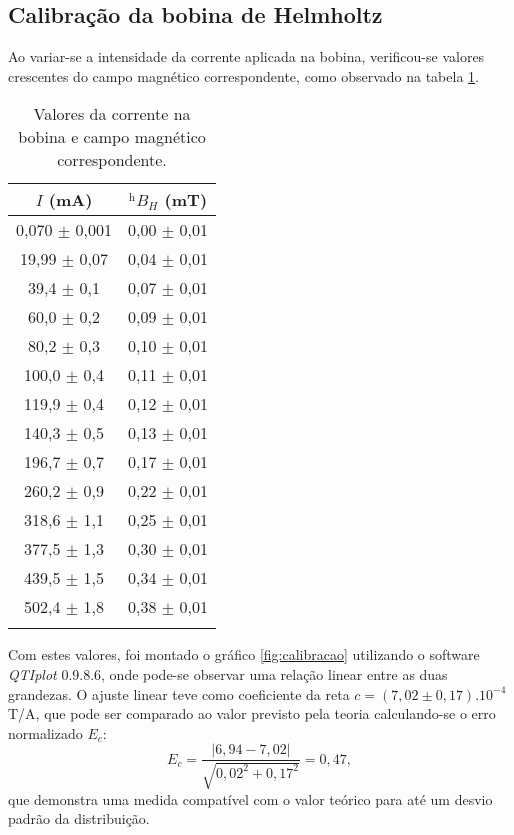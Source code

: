 \documentclass[reprint,amsmath,amssymb,aps]{revtex4-2}
\begin{document}
\subsection{Calibração da bobina de Helmholtz}

Ao variar-se a intensidade da corrente aplicada na bobina, verificou-se valores crescentes do campo magnético correspondente, como observado na tabela \ref{tab:calibracao}.

\begin{table}[H]
\centering
\caption{\label{tab:calibracao} Valores da corrente na bobina e campo magnético correspondente.}
\begin{tabular}{cc}
\hhline{==}
$I$ (mA)            & $^\text{h}B_H$ (mT)              \\ \hline
0,070 $\pm$ 0,001 & 0,00   $\pm$ 0,01   \\
19,99 $\pm$ 0,07  & 0,04   $\pm$ 0,01   \\
39,4 $\pm$ 0,1    & 0,07   $\pm$ 0,01   \\
60,0 $\pm$ 0,2    & 0,09   $\pm$ 0,01   \\
80,2 $\pm$ 0,3    & 0,10   $\pm$ 0,01   \\
100,0 $\pm$ 0,4   & 0,11   $\pm$ 0,01   \\
119,9 $\pm$ 0,4   & 0,12   $\pm$ 0,01   \\
140,3 $\pm$ 0,5   & 0,13   $\pm$ 0,01   \\
196,7 $\pm$ 0,7   & 0,17   $\pm$ 0,01   \\
260,2 $\pm$ 0,9   & 0,22   $\pm$ 0,01   \\
318,6 $\pm$ 1,1   & 0,25   $\pm$ 0,01   \\
377,5 $\pm$ 1,3   & 0,30   $\pm$ 0,01   \\
439,5 $\pm$ 1,5   & 0,34   $\pm$ 0,01   \\
502,4 $\pm$ 1,8   & 0,38   $\pm$ 0,01   \\
\hhline{==}
\end{tabular}
\end{table}

Com estes valores, foi montado o gráfico \ref{fig:calibracao} utilizando o software \textit{QTIplot} 0.9.8.6, onde pode-se observar uma relação linear entre as duas grandezas. O ajuste linear teve como coeficiente da reta $c=(7,02 \pm 0,17).10^{-4}$ T/A, que pode ser comparado ao valor previsto pela teoria \cite{efieldcalc} calculando-se o erro normalizado $E_c$:
\begin{equation}
    E_c=\frac{|6,94-7,02|}{\sqrt{0,02^2+0,17^2}}=0,47,
\end{equation}
que demonstra uma medida compatível com o valor teórico para até um desvio padrão da distribuição.
\end{document}
